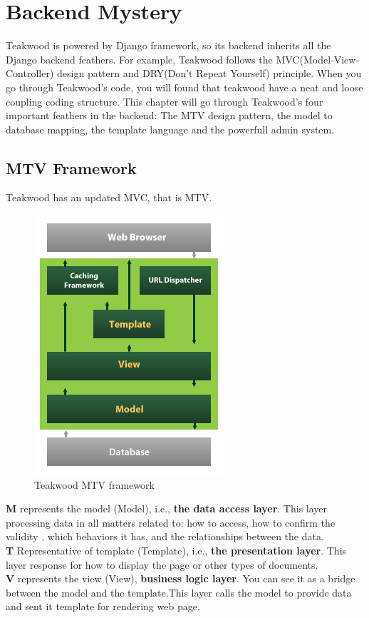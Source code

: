\chapter{Backend Mystery} 
Teakwood is powered by Django framework, so its backend inherits all the Django  backend feathers. For example, Teakwood follows the MVC(Model-View-Controller) design pattern and DRY(Don't Repeat Yourself) principle. When you go through Teakwood's code, you will found that teakwood have a neat and loose coupling coding structure. This chapter will go through Teakwood's four important feathers in the backend: The MTV design pattern, the model to database mapping, the template language and the powerfull admin system.

\section{MTV Framework}
Teakwood has an updated MVC, that is MTV.\\
\begin{figure}[htb]
\centering
\includegraphics[scale=0.5]{./mtv}
\caption{Teakwood MTV framework}
\label{fig:label} %
\end{figure}

\textbf{M} represents the model (Model), i.e., \textbf{the data access layer}. This layer processing data in all matters related to: how to access, how to confirm the validity , which behaviors it has, and the relationships between the data.\\
\textbf{T} Representative of template (Template), i.e., \textbf{the presentation layer}. This layer response for how to display the page or other types of documents.\\
\textbf{V} represents the view (View), \textbf{business logic layer}. You can see it as a bridge between the model and the template.This layer calls the model to provide data and sent it template for rendering web page. \\

